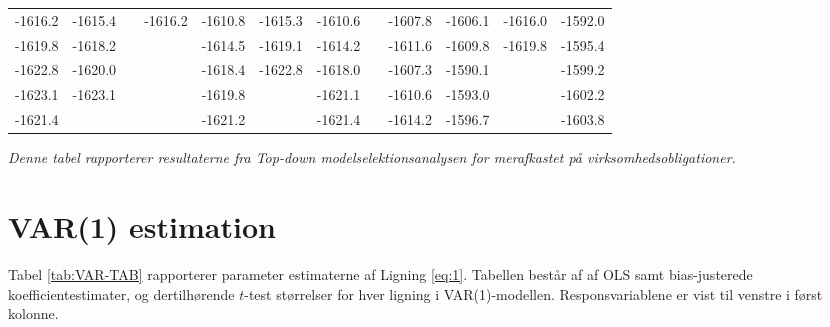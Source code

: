 \documentclass[
  a4paper,
  oneside]{memoir}
\begin{document}
\begin{landscape}
\begin{table}[H]
\begin{threeparttable}
\begin{tabular}[t]{cccccccccccc}
\rowcolor{gray!6}  -1616.2 & -1615.4 &  & -1616.2 & -1610.8 & -1615.3 & -1610.6 &  & -1607.8 & -1606.1 & -1616.0 & -1592.0\\
 
-1619.8 & -1618.2 &  &  & -1614.5 & -1619.1 & -1614.2 &  & -1611.6 & -1609.8 & -1619.8 & -1595.4\\
 
\rowcolor{gray!6}  -1622.8 & -1620.0 &  &  & -1618.4 & -1622.8 & -1618.0 &  & -1607.3 & -1590.1 &  & -1599.2\\
 
-1623.1 & -1623.1 &  &  & -1619.8 &  & -1621.1 &  & -1610.6 & -1593.0 &  & -1602.2\\
 
\rowcolor{gray!6}  -1621.4 &  &  &  & -1621.2 &  & -1621.4 &  & -1614.2 & -1596.7 &  & -1603.8\\
\bottomrule
\end{tabular}
\begin{tablenotes}
\item \textit{Denne tabel rapporterer resultaterne fra \textit{Top-down} modelselektionsanalysen for merafkastet på virksomhedsobligationer.}
\end{tablenotes}
\end{threeparttable}
\end{table}
\end{landscape}

\hypertarget{var1est}{%
\section{VAR(1) estimation}\label{var1est}}

Tabel \ref{tab:VAR-TAB} rapporterer parameter estimaterne af Ligning \eqref{eq:1}. Tabellen består af af OLS samt bias-justerede koefficientestimater, og dertilhørende \(t\)-test størrelser for hver ligning i VAR(1)-modellen. Responsvariablene er vist til venstre i først kolonne.
\end{document}
